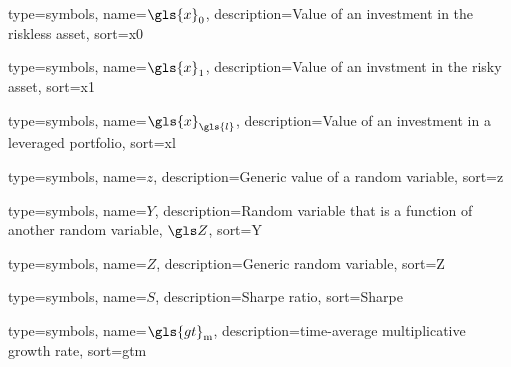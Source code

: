 {
  type={symbols}, 
  name={\ensuremath{\gls{x}_0}},
  description={Value of an investment in the riskless asset},
  sort=x0
}

{
  type={symbols}, 
  name={\ensuremath{\gls{x}_1}},
  description={Value of an invstment in the risky asset},
  sort=x1
}

{
  type={symbols}, 
  name={\ensuremath{\gls{x}_{\gls{l}}}},
  description={Value of an investment in a leveraged portfolio},
  sort=xl
}

{
  type={symbols}, 
  name={\ensuremath{z}},
  description={Generic value of a random variable},
  sort=z
}

{
  type={symbols}, 
  name={\ensuremath{Y}},
  description={Random variable that is a function of another random variable, $\Z$},
  sort=Y
}

{
  type={symbols}, 
  name={\ensuremath{Z}},
  description={Generic random variable},
  sort=Z
}


{
  type={symbols}, 
  name={\ensuremath{S}},
  description={Sharpe ratio},
  sort=Sharpe
}

{
  type={symbols}, 
  name={\ensuremath{\gls{gt}_\text{m}}},
  description={time-average multiplicative growth rate},
  sort=gtm
}
